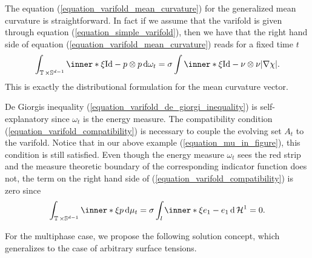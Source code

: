 The equation (\ref{equation_varifold_mean_curvature}) for the generalized mean 
curvature is straightforward. In fact if we
assume that the varifold is given through equation 
(\ref{equation_simple_varifold}), then we have that the right hand side of 
equation 
(\ref{equation_varifold_mean_curvature}) reads for a fixed time $ t $
\begin{equation*}
	\int_{ \flattorus \times \mathbb{ S }^{ d - 1 } }
	\inner*{ \xi }{ \mathrm{Id} - p \otimes p }
	\dd{ \omega_{ t } }
	=
	\sigma
	\int
	\inner*{ \xi }{\mathrm{Id} - \nu \otimes \nu }
	\abs{ \nabla \chi }.
\end{equation*}
This is exactly the distributional formulation for the mean curvature vector.

De Giorgis inequality (\ref{equation_varifold_de_giorgi_inequality}) is 
self-explanatory since $ \omega_{ t } $ is the energy measure. The 
compatibility condition (\ref{equation_varifold_compatibility}) is necessary to 
couple the evolving set $ A_{ t } $ to 
the varifold. Notice that in our above example (\ref{equation_mu_in_figure}), 
this condition is still satisfied.
Even though the energy measure $ 
\omega_{ t } $ sees the red strip 
and the measure theoretic boundary of the corresponding indicator function does 
not, the term on the right hand side of 
(\ref{equation_varifold_compatibility}) 
is zero since
\begin{equation*}
	\int_{ \flattorus \times \mathbb{ S }^{ d - 1 } }
	\inner*{ \xi }{ p }
	\dd{ \mu_{ t } }
	=
	\sigma
	\int_{ l }
	\inner*{ \xi }{ e_{ 1 } - e_{ 1 } }
	\dd{ \hm^{ 1 } }
	= 
	0.
\end{equation*}

For the multiphase case, we propose the following solution concept, which 
generalizes
\cite[Def.~2]{hensel_laux_varifold_solution_concept_for_mean_curvature_flow} to 
the case of arbitrary surface tensions.

